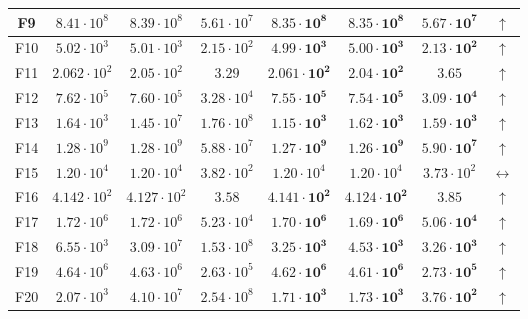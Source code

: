 \begin{table}[!t]
\begin{scriptsize}
\begin{tabular}{c || c c c | c c c c}
F9  & $8.41 \cdot 10^{8}$   & $8.39  \cdot 10^{8}$  & $5.61 \cdot 10^{7}$  & $\mathbf{8.35 \cdot 10^{8}}$   & $\mathbf{8.35 \cdot 10^{8}}$  & $\mathbf{5.67 \cdot 10^{7}}$ & $\uparrow$ \\ \hline
F10 & $5.02 \cdot 10^{3}$   & $5.01  \cdot 10^{3}$  & $2.15 \cdot 10^{2}$  & $\mathbf{4.99 \cdot 10^{3}}$   & $\mathbf{5.00 \cdot 10^{3}}$  & $\mathbf{2.13 \cdot 10^{2}}$ & $\uparrow$ \\ \hline
F11 & $2.062 \cdot 10^{2}$  & $2.05  \cdot 10^{2}$  & $3.29$               & $\mathbf{2.061 \cdot 10^{2}}$  & $\mathbf{2.04 \cdot 10^{2}}$  & $\mathbf{3.65}$ & $\uparrow$ \\ \hline
F12 & $7.62 \cdot 10^{5}$   & $7.60  \cdot 10^{5}$  & $3.28 \cdot 10^{4}$  & $\mathbf{7.55 \cdot 10^{5}}$   & $\mathbf{7.54 \cdot 10^{5}}$  & $\mathbf{3.09 \cdot 10^{4}}$ & $\uparrow$ \\ \hline
F13 & $1.64 \cdot 10^{3}$   & $1.45  \cdot 10^{7}$  & $1.76 \cdot 10^{8}$  & $\mathbf{1.15 \cdot 10^{3}}$   & $\mathbf{1.62 \cdot 10^{3}}$  & $\mathbf{1.59 \cdot 10^{3}}$ & $\uparrow$ \\ \hline
F14 & $1.28 \cdot 10^{9}$   & $1.28  \cdot 10^{9}$  & $5.88 \cdot 10^{7}$  & $\mathbf{1.27 \cdot 10^{9}}$   & $\mathbf{1.26 \cdot 10^{9}}$  & $\mathbf{5.90 \cdot 10^{7}}$ & $\uparrow$ \\ \hline
F15 & $1.20 \cdot 10^{4}$   & $1.20  \cdot 10^{4}$  & $3.82 \cdot 10^{2}$  & $1.20 \cdot 10^{4}$   & $1.20 \cdot 10^{4}$  & $3.73 \cdot 10^{2}$ & $\leftrightarrow$ \\ \hline
F16 & $4.142 \cdot 10^{2}$  & $4.127 \cdot 10^{2}$  & $3.58$               & $\mathbf{4.141 \cdot 10^{2}}$  & $\mathbf{4.124 \cdot 10^{2}}$ & $\mathbf{3.85}$ & $\uparrow$ \\ \hline
F17 & $1.72 \cdot 10^{6}$   & $1.72  \cdot 10^{6}$  & $5.23 \cdot 10^{4}$  & $\mathbf{1.70 \cdot 10^{6}}$   & $\mathbf{1.69 \cdot 10^{6}}$  & $\mathbf{5.06 \cdot 10^{4}}$ & $\uparrow$ \\ \hline
F18 & $6.55 \cdot 10^{3}$   & $3.09  \cdot 10^{7}$  & $1.53 \cdot 10^{8}$  & $\mathbf{3.25 \cdot 10^{3}}$   & $\mathbf{4.53 \cdot 10^{3}}$  & $\mathbf{3.26 \cdot 10^{3}}$ & $\uparrow$ \\ \hline
F19 & $4.64 \cdot 10^{6}$   & $4.63  \cdot 10^{6}$  & $2.63 \cdot 10^{5}$  & $\mathbf{4.62 \cdot 10^{6}}$   & $\mathbf{4.61 \cdot 10^{6}}$  & $\mathbf{2.73 \cdot 10^{5}}$ & $\uparrow$ \\ \hline
F20 & $2.07 \cdot 10^{3}$   & $4.10  \cdot 10^{7}$  & $2.54 \cdot 10^{8}$  & $\mathbf{1.71 \cdot 10^{3}}$   & $\mathbf{1.73 \cdot 10^{3}}$  & $\mathbf{3.76 \cdot 10^{2}}$ & $\uparrow$ \\ \hline
\end{tabular}
\end{scriptsize}
\end{table}



